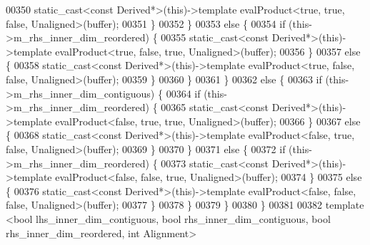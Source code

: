 \begin{DoxyCode}
00350           \textcolor{keyword}{static\_cast<}\textcolor{keyword}{const }Derived*\textcolor{keyword}{>}(\textcolor{keyword}{this})->\textcolor{keyword}{template} evalProduct<true, true, false, Unaligned>(buffer);
00351         \}
00352       \}
00353       \textcolor{keywordflow}{else} \{
00354        \textcolor{keywordflow}{if} (this->m\_rhs\_inner\_dim\_reordered) \{
00355           \textcolor{keyword}{static\_cast<}\textcolor{keyword}{const }Derived*\textcolor{keyword}{>}(\textcolor{keyword}{this})->\textcolor{keyword}{template} evalProduct<true, false, true, Unaligned>(buffer);
00356         \}
00357         \textcolor{keywordflow}{else} \{
00358           \textcolor{keyword}{static\_cast<}\textcolor{keyword}{const }Derived*\textcolor{keyword}{>}(\textcolor{keyword}{this})->\textcolor{keyword}{template} evalProduct<true, false, false, Unaligned>(buffer);
00359         \}
00360       \}
00361     \}
00362     \textcolor{keywordflow}{else} \{
00363       \textcolor{keywordflow}{if} (this->m\_rhs\_inner\_dim\_contiguous) \{
00364         \textcolor{keywordflow}{if} (this->m\_rhs\_inner\_dim\_reordered) \{
00365           \textcolor{keyword}{static\_cast<}\textcolor{keyword}{const }Derived*\textcolor{keyword}{>}(\textcolor{keyword}{this})->\textcolor{keyword}{template} evalProduct<false, true, true, Unaligned>(buffer);
00366         \}
00367         \textcolor{keywordflow}{else} \{
00368           \textcolor{keyword}{static\_cast<}\textcolor{keyword}{const }Derived*\textcolor{keyword}{>}(\textcolor{keyword}{this})->\textcolor{keyword}{template} evalProduct<false, true, false, Unaligned>(buffer);
00369         \}
00370       \}
00371       \textcolor{keywordflow}{else} \{
00372        \textcolor{keywordflow}{if} (this->m\_rhs\_inner\_dim\_reordered) \{
00373           \textcolor{keyword}{static\_cast<}\textcolor{keyword}{const }Derived*\textcolor{keyword}{>}(\textcolor{keyword}{this})->\textcolor{keyword}{template} evalProduct<false, false, true, Unaligned>(buffer);
00374         \}
00375         \textcolor{keywordflow}{else} \{
00376           \textcolor{keyword}{static\_cast<}\textcolor{keyword}{const }Derived*\textcolor{keyword}{>}(\textcolor{keyword}{this})->\textcolor{keyword}{template} evalProduct<false, false, false, Unaligned>(buffer);
00377         \}
00378       \}
00379     \}
00380   \}
00381 
00382   \textcolor{keyword}{template} <\textcolor{keywordtype}{bool} lhs\_inner\_dim\_contiguous, \textcolor{keywordtype}{bool} rhs\_inner\_dim\_contiguous, \textcolor{keywordtype}{bool} rhs\_inner\_dim\_reordered, \textcolor{keywordtype}{int}
       Alignment>

\end{DoxyCode}
